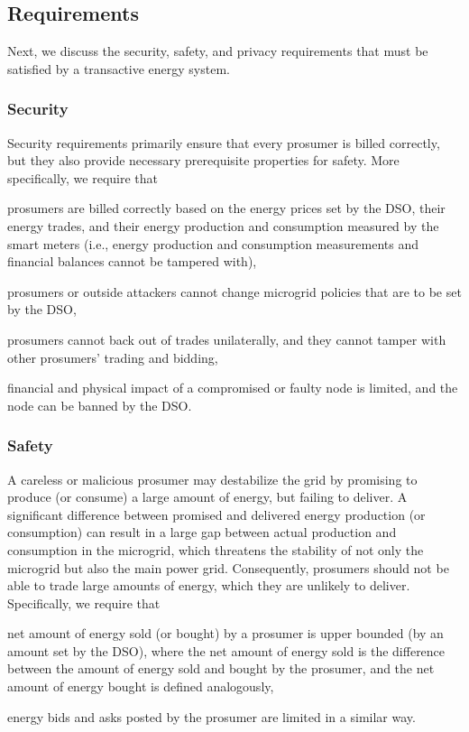\subsection{Requirements}
Next, we discuss the security, safety, and privacy requirements that must be satisfied by a transactive energy system.

\subsubsection{Security}
Security requirements primarily ensure that every prosumer is billed correctly, but they also provide necessary prerequisite properties for safety.
More specifically, we require that 
\begin{compactitem}
\item prosumers are billed correctly based on the energy prices set by the DSO, their energy trades, and their energy production and consumption measured by the smart meters (i.e., energy production and consumption measurements and financial balances cannot be tampered with),
\item prosumers or outside attackers cannot change microgrid policies that are to be set by the DSO,
\item prosumers cannot back out of trades unilaterally, and they cannot tamper with other prosumers' trading and bidding,
\item financial and physical impact of a compromised or faulty node is limited, and the node can be banned by the DSO.
\end{compactitem}

\subsubsection{Safety}
A careless or malicious prosumer may destabilize the grid by promising to produce (or consume) a large amount of energy, but failing to deliver.
A significant difference between promised and delivered energy production (or consumption) can result in a large gap between actual production and consumption in the microgrid, which threatens the stability of not only the microgrid but also the main power grid.
Consequently, prosumers should not be able to trade large amounts of energy, which they are unlikely to deliver.
Specifically, we require that
\begin{compactitem}
\item net amount of energy sold (or bought) by a prosumer is upper bounded (by an amount set by the DSO), where the net amount of energy sold is the difference between the amount of energy sold and bought by the prosumer, and the net amount of energy bought is defined analogously,
\item energy bids and asks posted by the prosumer are limited in a similar way.
\end{compactitem}

